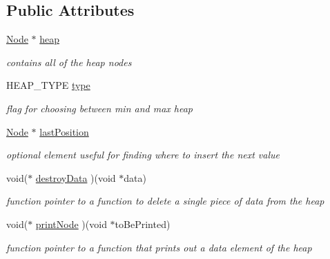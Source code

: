 \subsection*{Public Attributes}
\begin{DoxyCompactItemize}
\item 
\mbox{\label{structHeap_a4f01a49a784cfda0ac4b0abd95a4ac06}} 
\hyperlink{structNode}{Node} $\ast$ \hyperlink{structHeap_a4f01a49a784cfda0ac4b0abd95a4ac06}{heap}
\begin{DoxyCompactList}\small\item\em contains all of the heap nodes \end{DoxyCompactList}\item 
\mbox{\label{structHeap_a687e85d124c882bb01f5c9bf91171129}} 
H\+E\+A\+P\+\_\+\+T\+Y\+PE \hyperlink{structHeap_a687e85d124c882bb01f5c9bf91171129}{type}
\begin{DoxyCompactList}\small\item\em flag for choosing between min and max heap \end{DoxyCompactList}\item 
\mbox{\label{structHeap_a016750f22dcb8be0fd9cde478d270dd5}} 
\hyperlink{structNode}{Node} $\ast$ \hyperlink{structHeap_a016750f22dcb8be0fd9cde478d270dd5}{last\+Position}
\begin{DoxyCompactList}\small\item\em optional element useful for finding where to insert the next value \end{DoxyCompactList}\item 
\mbox{\label{structHeap_abc8d0107b18de7599058485d78c2e244}} 
void($\ast$ \hyperlink{structHeap_abc8d0107b18de7599058485d78c2e244}{destroy\+Data} )(void $\ast$data)
\begin{DoxyCompactList}\small\item\em function pointer to a function to delete a single piece of data from the heap \end{DoxyCompactList}\item 
\mbox{\label{structHeap_a6f4d91e7eebe5e20d5ee60418c59c5e6}} 
void($\ast$ \hyperlink{structHeap_a6f4d91e7eebe5e20d5ee60418c59c5e6}{print\+Node} )(void $\ast$to\+Be\+Printed)
\begin{DoxyCompactList}\small\item\em function pointer to a function that prints out a data element of the heap \end{DoxyCompactList}\item 

\end{DoxyCompactItemize}
